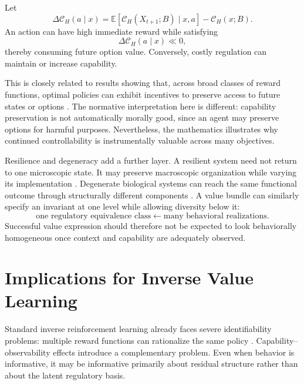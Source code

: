 \documentclass[11pt]{article}
\newcommand{\E}{\mathbb{E}}
\newcommand{\C}{\mathcal{C}}
\begin{document}
Let
\begin{equation}
    \Delta\C_H(a\mid x)
    =
    \E[\C_H(X_{t+1};B)\mid x,a]
    -
    \C_H(x;B).
\end{equation}
An action can have high immediate reward while satisfying
\[
    \Delta\C_H(a\mid x)\ll0,
\]
thereby consuming future option value. Conversely, costly regulation can maintain or increase capability.

This is closely related to results showing that, across broad classes of reward functions, optimal policies can exhibit incentives to preserve access to future states or options \citep{TurnerEtAl2021}. The normative interpretation here is different: capability preservation is not automatically morally good, since an agent may preserve options for harmful purposes. Nevertheless, the mathematics illustrates why continued controllability is instrumentally valuable across many objectives.

Resilience and degeneracy add a further layer. A resilient system need not return to one microscopic state. It may preserve macroscopic organization while varying its implementation \citep{Holling1973}. Degenerate biological systems can reach the same functional outcome through structurally different components \citep{EdelmanGally2001}. A value bundle can similarly specify an invariant at one level while allowing diversity below it:
\begin{equation}
    \text{one regulatory equivalence class}
    \longleftarrow
    \text{many behavioral realizations}.
\end{equation}
Successful value expression should therefore not be expected to look behaviorally homogeneous once context and capability are adequately observed.

\section{Implications for Inverse Value Learning}

Standard inverse reinforcement learning already faces severe identifiability problems: multiple reward functions can rationalize the same policy \citep{NgRussell2000}. Capability--observability effects introduce a complementary problem. Even when behavior is informative, it may be informative primarily about residual structure rather than about the latent regulatory basis.
\end{document}

